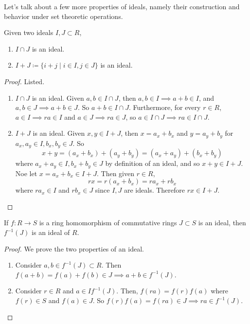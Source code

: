   Let's talk about a few more properties of ideals, namely their construction and behavior under set theoretic operations. 

  \begin{theorem} 
    \label{thm:sum_int_ideals}
    Given two ideals $I, J \subset R$, 
    \begin{enumerate}
      \item $I \cap J$ is an ideal. 
      \item $I + J \coloneqq \{i + j \mid i \in I, j \in J\}$ is an ideal. 
    \end{enumerate}
  \end{theorem}
  \begin{proof}
    Listed. 
    \begin{enumerate}
      \item $I \cap J$ is an ideal. Given $a, b \in I \cap J$, then $a, b \in I \implies a + b \in I$, and $a, b \in J \implies a + b \in J$. So $a + b \in I \cap J$. Furthermore, for every $r \in R$, $a \in I \implies r a \in I$ and $a \in J \implies r a \in J$, so $a \in I \cap J \implies ra \in I \cap J$. 

      \item $I + J$ is an ideal. Given $x, y \in I + J$, then $x = a_x + b_x$ and $y = a_y + b_y$ for $a_x, a_y \in I, b_x, b_y \in J$. So 
      \begin{equation}
        x + y = (a_x + b_x) + (a_y + b_y) = (a_x + a_y) + (b_x + b_y)
      \end{equation}
      where $a_x + a_y \in I, b_x + b_y \in J$ by definition of an ideal, and so $x + y \in I + J$. Noe let $x = a_x + b_x \in I + J$. Then given $r \in R$,
      \begin{equation}
        rx = r(a_x + b_x) = r a_x + r b_x
      \end{equation}
      where $r a_x \in I$ and $r b_x \in J$ since $I, J$ are ideals. Therefore $rx \in I + J$.  
    \end{enumerate}
  \end{proof}
  
  \begin{theorem}
    If $f: R \to S$ is a ring homomorphism of commutative rings $J \subset S$ is an ideal, then $f^{-1} (J)$ is an ideal of $R$. 
  \end{theorem}
  \begin{proof}
    We prove the two properties of an ideal. 
    \begin{enumerate}
      \item Consider $a, b \in f^{-1} (J) \subset R$. Then $f(a + b) = f(a) + f(b) \in J \implies a + b \in f^{-1}(J)$. 
      \item Consider $r \in R$ and $a \in I f^{-1}(J)$. Then, $f(ra) = f(r) f(a)$ where $f(r) \in S$ and $f(a) \in J$. So $f(r) f(a) = f(ra) \in J \implies ra \in f^{-1}(J)$. 
    \end{enumerate}
  \end{proof}

